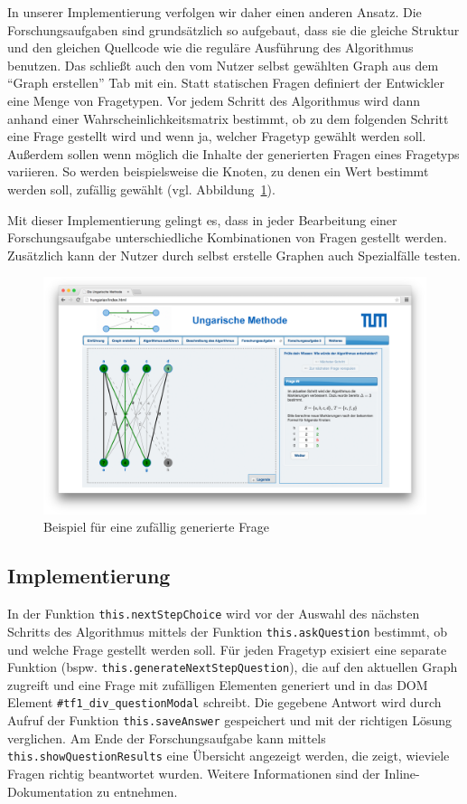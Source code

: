 In unserer Implementierung verfolgen wir daher einen anderen Ansatz. Die Forschungsaufgaben sind grundsätzlich so aufgebaut, dass sie die gleiche Struktur und den gleichen Quellcode wie die reguläre Ausführung des Algorithmus benutzen. Das schließt auch den vom Nutzer selbst gewählten Graph aus dem \enquote{Graph erstellen} Tab mit ein. Statt statischen Fragen definiert der Entwickler eine Menge von Fragetypen. Vor jedem Schritt des Algorithmus wird dann anhand einer Wahrscheinlichkeitsmatrix bestimmt, ob zu dem folgenden Schritt eine Frage gestellt wird und wenn ja, welcher Fragetyp gewählt werden soll. Außerdem sollen wenn möglich die Inhalte der generierten Fragen eines Fragetyps variieren. So werden beispielsweise die Knoten, zu denen ein Wert bestimmt werden soll, zufällig gewählt (vgl. Abbildung~\ref{fig:random-question}).

Mit dieser Implementierung gelingt es, dass in jeder Bearbeitung einer Forschungsaufgabe unterschiedliche Kombinationen von Fragen gestellt werden. Zusätzlich kann der Nutzer durch selbst erstelle Graphen auch Spezialfälle testen.

\begin{figure}[h!]
	\centering
	\includegraphics[width=\textwidth]{figures/random_question}
	\caption[Zufällig generierte Frage]{Beispiel für eine zufällig generierte Frage}\label{fig:random-question}
\end{figure}

\subsection*{Implementierung}
In der Funktion \texttt{this.nextStepChoice} wird vor der Auswahl des nächsten Schritts des Algorithmus mittels der Funktion \texttt{this.askQuestion} bestimmt, ob und welche Frage gestellt werden soll. Für jeden Fragetyp exisiert eine separate Funktion (bspw. \texttt{this.generateNextStepQuestion}), die auf den aktuellen Graph zugreift und eine Frage mit zufälligen Elementen generiert und in das DOM Element \texttt{\#tf1\_div\_questionModal} schreibt. Die gegebene Antwort wird durch Aufruf der Funktion \texttt{this.saveAnswer} gespeichert und mit der richtigen Lösung verglichen. Am Ende der Forschungsaufgabe kann mittels \texttt{this.showQuestionResults} eine Übersicht angezeigt werden, die zeigt, wieviele Fragen richtig beantwortet wurden. Weitere Informationen sind der Inline-Dokumentation zu entnehmen.

